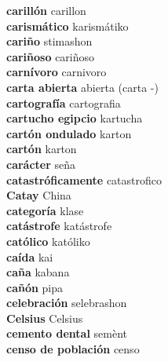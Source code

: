 \textbf{ carillón  } carillon \\
\textbf{ carismático  } karismátiko \\
\textbf{ cariño  } stimashon \\
\textbf{ cariñoso  } cariñoso \\
\textbf{ carnívoro  } carnivoro \\
\textbf{ carta abierta  } abierta (carta -) \\
\textbf{ cartografía  } cartografia \\
\textbf{ cartucho egipcio  } kartucha \\
\textbf{ cartón ondulado  } karton \\
\textbf{ cartón  } karton \\
\textbf{ carácter  } seña \\
\textbf{ catastróficamente  } catastrofico \\
\textbf{ Catay  } China \\
\textbf{ categoría  } klase \\
\textbf{ catástrofe  } katástrofe \\
\textbf{ católico  } katóliko \\
\textbf{ caída  } kai \\
\textbf{ caña  } kabana \\
\textbf{ cañón  } pipa \\
\textbf{ celebración  } selebrashon \\
\textbf{ Celsius  } Celsius \\
\textbf{ cemento dental  } semènt \\
\textbf{ censo de población  } censo \\
